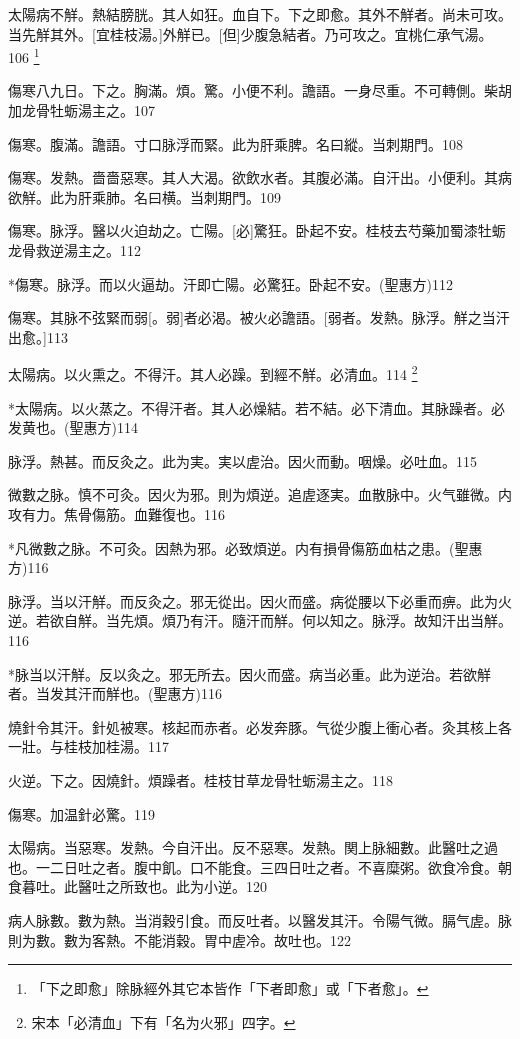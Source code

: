 \documentclass[12pt,twoside,UTF8,b5paper]{ctexbook}
\begin{document}
太陽病不觧。熱結膀胱。其人如狂。血自下。下之即愈。其外不觧者。尚未可攻。当先觧其外。[宜桂枝湯。]外觧已。[但]少腹急結者。乃可攻之。宜桃仁承气湯。106
	\footnote{「下之即愈」除脉經外其它本皆作「下者即愈」或「下者愈」。}

傷寒八九日。下之。胸滿。煩。驚。小便不利。譫語。一身尽重。不可轉側。柴胡加龙骨牡蛎湯主之。107

傷寒。腹滿。譫語。寸口脉浮而緊。此为肝乘脾。名曰縱。当刺期門。108

傷寒。发熱。嗇嗇惡寒。其人大渴。欲飲水者。其腹必滿。自汗出。小便利。其病欲觧。此为肝乘肺。名曰横。当刺期門。109

傷寒。脉浮。醫以火迫劫之。亡陽。[必]驚狂。卧起不安。桂枝去芍藥加蜀漆牡蛎龙骨救逆湯主之。112

*傷寒。脉浮。而以火逼劫。汗即亡陽。必驚狂。卧起不安。(聖惠方)112

傷寒。其脉不弦緊而弱[。弱]者必渴。被火必譫語。[弱者。发熱。脉浮。觧之当汗出愈。]113

太陽病。以火熏之。不得汗。其人必躁。到經不觧。必清血。114
	\footnote{宋本「必清血」下有「名为火邪」四字。}

*太陽病。以火蒸之。不得汗者。其人必燥結。若不結。必下清血。其脉躁者。必发黄也。(聖惠方)114

脉浮。熱甚。而反灸之。此为実。実以虗治。因火而動。咽燥。必吐血。115　

微數之脉。慎不可灸。因火为邪。則为煩逆。追虗逐実。血散脉中。火气雖微。内攻有力。焦骨傷筋。血難復也。116

*凡微數之脉。不可灸。因熱为邪。必致煩逆。内有損骨傷筋血枯之患。(聖惠方)116

脉浮。当以汗觧。而反灸之。邪无從出。因火而盛。病從腰以下必重而痹。此为火逆。若欲自觧。当先煩。煩乃有汗。隨汗而觧。何以知之。脉浮。故知汗出当觧。116

*脉当以汗觧。反以灸之。邪无所去。因火而盛。病当必重。此为逆治。若欲觧者。当发其汗而觧也。(聖惠方)116

燒針令其汗。針処被寒。核起而赤者。必发奔豚。气從少腹上衝心者。灸其核上各一壯。与桂枝加桂湯。117

火逆。下之。因燒針。煩躁者。桂枝甘草龙骨牡蛎湯主之。118

傷寒。加温針必驚。119

太陽病。当惡寒。发熱。今自汗出。反不惡寒。发熱。関上脉細數。此醫吐之過也。一二日吐之者。腹中飢。口不能食。三四日吐之者。不喜糜粥。欲食冷食。朝食暮吐。此醫吐之所致也。此为小逆。120

病人脉數。數为熱。当消穀引食。而反吐者。以醫发其汗。令陽气微。膈气虗。脉則为數。數为客熱。不能消穀。胃中虗冷。故吐也。122
\end{document}
